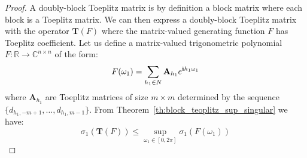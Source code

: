 \begin{proof}

A doubly-block Toeplitz matrix is by definition a block matrix where each block is a Toeplitz matrix. We can then express a doubly-block Toeplitz matrix with the operator $\mathbf{T}(F)$ where the matrix-valued generating function $F$ has Toeplitz coefficient. Let us define a matrix-valued trigonometric polynomial $F:\mathbb{R}\rightarrow\mathbb{C}^{n \times n}$ of the form:
\begin{equation}
    F(\omega_1) = \sum_{h_1 \in N} \mathbf{A}_{h_1}e^{\mathbf{i} h_1\omega_1}
\end{equation}
where $\mathbf{A}_{h_1}$ are Toeplitz matrices of size $m \times m$ determined by the sequence $\{d_{h_1, -m+1}, \dots, d_{h_1, m-1} \}$. 
From Theorem~\ref{th:block_teoplitz_sup_singular} we have:
\begin{equation}
\sigma_1\left(\mathbf{T}(F) \right) \leq \sup_{\omega_1 \in [0,2\pi] } \sigma_{1}\left( F(\omega_1) \right) \label{appendix-eq:th_bound_block_toeplitz}
\end{equation}


\end{proof}
